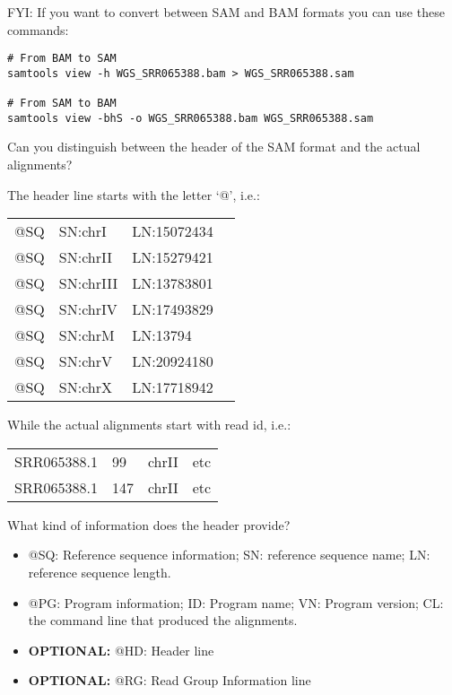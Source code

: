 \begin{note}
FYI: If you want to convert between SAM and BAM formats you can use these commands:
\begin{lstlisting}
# From BAM to SAM
samtools view -h WGS_SRR065388.bam > WGS_SRR065388.sam

# From SAM to BAM
samtools view -bhS -o WGS_SRR065388.bam WGS_SRR065388.sam
\end{lstlisting}
\end{note}

\begin{questions}
Can you distinguish between the header of the SAM format and the actual alignments?
\begin{answer}
The header line starts with the letter `@', i.e.: \\
\begin{tabular}{llll}
@SQ & SN:chrI & LN:15072434 \\
@SQ & SN:chrII & LN:15279421 \\
@SQ & SN:chrIII & LN:13783801 \\
@SQ & SN:chrIV & LN:17493829 \\
@SQ & SN:chrM & LN:13794 \\
@SQ & SN:chrV & LN:20924180 \\
@SQ & SN:chrX & LN:17718942 \\
\end{tabular}

While the actual alignments start with read id, i.e.: \\

\begin{tabular}{llll}
SRR065388.1 & 99 & chrII & etc \\
SRR065388.1 & 147 & chrII & etc \\
\end{tabular}

\end{answer}
What kind of information does the header provide? \\
\begin{answer}
\begin{itemize}
\item @SQ: Reference sequence information; SN: reference sequence name; LN: reference sequence length.
\item @PG: Program information; ID: Program name; VN: Program version; CL: the command line that produced the alignments.
\item \textbf{OPTIONAL:} @HD: Header line
\item \textbf{OPTIONAL:} @RG: Read Group Information line
\end{itemize}
\end{answer}
\end{questions}

